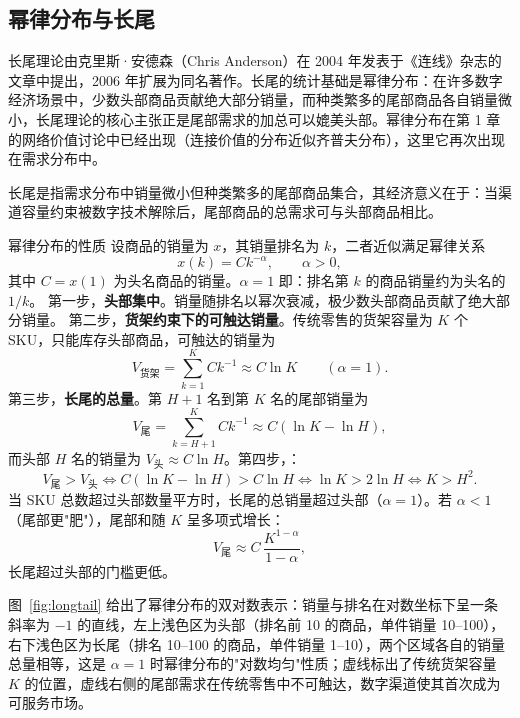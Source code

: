 \subsection{幂律分布与长尾}

长尾理论由克里斯·安德森（Chris Anderson）在 2004 年发表于《连线》杂志的文章中提出，2006 年扩展为同名著作。长尾的统计基础是幂律分布：在许多数字经济场景中，少数头部商品贡献绝大部分销量，而种类繁多的尾部商品各自销量微小，长尾理论的核心主张正是尾部需求的加总可以媲美头部。幂律分布在第 1 章的网络价值讨论中已经出现（连接价值的分布近似齐普夫分布），这里它再次出现在需求分布中。

\begin{definition}
长尾是指需求分布中销量微小但种类繁多的尾部商品集合，其经济意义在于：当渠道容量约束被数字技术解除后，尾部商品的总需求可与头部商品相比。
\end{definition}

\begin{derivation}{幂律分布的性质}{}
设商品的销量为 $x$，其销量排名为 $k$，二者近似满足幂律关系
\[
x(k) = C k^{-\alpha}, \qquad \alpha > 0,
\]
其中 $C = x(1)$ 为头名商品的销量。$\alpha = 1$ 即：排名第 $k$ 的商品销量约为头名的 $1/k$。
第一步，\textbf{头部集中}。销量随排名以幂次衰减，极少数头部商品贡献了绝大部分销量。
第二步，\textbf{货架约束下的可触达销量}。传统零售的货架容量为 $K$ 个 SKU，只能库存头部商品，可触达的销量为
\[
V_{\text{货架}} = \sum_{k=1}^{K} C k^{-1} \approx C \ln K \qquad (\alpha = 1).
\]
第三步，\textbf{长尾的总量}。第 $H+1$ 名到第 $K$ 名的尾部销量为
\[
V_{\text{尾}} = \sum_{k=H+1}^{K} C k^{-1} \approx C(\ln K - \ln H),
\]
而头部 $H$ 名的销量为 $V_{\text{头}} \approx C \ln H$。第四步，：
\[
V_{\text{尾}} > V_{\text{头}} \iff C(\ln K - \ln H) > C \ln H \iff \ln K > 2\ln H \iff K > H^2.
\]
当 SKU 总数超过头部数量平方时，长尾的总销量超过头部（$\alpha = 1$）。若 $\alpha < 1$（尾部更"肥"），尾部和随 $K$ 呈多项式增长：
\[
V_{\text{尾}} \approx C\,\frac{K^{1-\alpha}}{1-\alpha},
\]
长尾超过头部的门槛更低。
\end{derivation}

图~\ref{fig:longtail} 给出了幂律分布的双对数表示：销量与排名在对数坐标下呈一条斜率为 $-1$ 的直线，左上浅色区为头部（排名前 10 的商品，单件销量 10--100），右下浅色区为长尾（排名 10--100 的商品，单件销量 1--10），两个区域各自的销量总量相等，这是 $\alpha = 1$ 时幂律分布的"对数均匀"性质；虚线标出了传统货架容量 $K$ 的位置，虚线右侧的尾部需求在传统零售中不可触达，数字渠道使其首次成为可服务市场。

